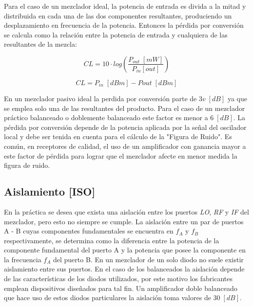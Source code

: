 \documentclass[twocolumn]{article}
\begin{document}
Para el caso de un mezclador ideal, la potencia de entrada es divida a la mitad y distribuida en cada una de las dos componentes resultantes, produciendo un desplazamiento en frecuencia de la potencia. Entonces la pérdida por conversión se calcula como la relación entre la potencia de entrada y cualquiera de las resultantes de la mezcla:

\[CL = 10 \cdot log \left( \frac{P_{out} \; [mW]}{P_{in} [out]} \right) \]

\begin{equation}
CL = P_{in} \; [dBm]- P{out} \; [dBm] \label{eq:1}
\end{equation}

En un mezclador pasivo ideal la perdida por conversión parte de $3v\; [dB]$ ya que se emplea solo una de las resultantes del producto. Para el caso de un mezclador práctico balanceado o doblemente balanceado este factor es menor a $6 \; [dB]$. La pérdida por conversión depende de la potencia aplicada por la señal del oscilador local y debe ser tenida en cuenta para el cálculo de la "Figura de Ruido". Es común, en receptores de calidad, el uso de un amplificador con ganancia mayor a este factor de pérdida para lograr que el mezclador afecte en menor medida la figura de ruido.

\subsection{Aislamiento [ISO]}
En la práctica se desea que exista una aislación entre los puertos \textit{LO}, \textit{RF} y \textit{IF} del mezclador, pero esto no siempre se cumple. La aislación entre un par de puertos A - B cuyas componentes fundamentales se encuentra en $f_A$ y $f_B$ respectivamente, se determina como la diferencia entre la potencia de la componente fundamental del puerto A y la potencia que posee la componente en la frecuencia $f_A$ del puerto B. En un mezclador de un solo diodo no suele existir aislamiento entre sus puertos. En el caso de los balanceados la aislación depende de las características de los diodos utilizados, por este motivo los fabricantes emplean dispositivos diseñados para tal fin. Un amplificador doble balanceado que hace uso de estos diodos particulares la aislación toma valores de $30 \; [dB]$. 
\end{document}
